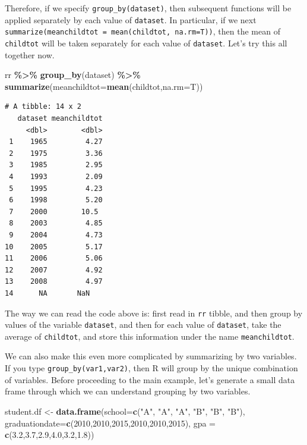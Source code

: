 \documentclass[
]{book}
\newenvironment{Shaded}{\begin{snugshade}}{\end{snugshade}}
\newcommand{\AttributeTok}[1]{\textcolor[rgb]{0.13,0.29,0.53}{#1}}
\newcommand{\DecValTok}[1]{\textcolor[rgb]{0.00,0.00,0.81}{#1}}
\newcommand{\FloatTok}[1]{\textcolor[rgb]{0.00,0.00,0.81}{#1}}
\newcommand{\FunctionTok}[1]{\textcolor[rgb]{0.13,0.29,0.53}{\textbf{#1}}}
\newcommand{\NormalTok}[1]{#1}
\newcommand{\OtherTok}[1]{\textcolor[rgb]{0.56,0.35,0.01}{#1}}
\newcommand{\SpecialCharTok}[1]{\textcolor[rgb]{0.81,0.36,0.00}{\textbf{#1}}}
\newcommand{\StringTok}[1]{\textcolor[rgb]{0.31,0.60,0.02}{#1}}
\begin{document}
Therefore, if we specify \texttt{group\_by(dataset)}, then subsequent functions will be applied separately by each value of \texttt{dataset}. In particular, if we next \texttt{summarize(meanchildtot\ =\ mean(childtot,\ na.rm=T))}, then the mean of \texttt{childtot} will be taken separately for each value of \texttt{dataset}. Let's try this all together now.

\begin{Shaded}
\begin{Highlighting}[]
\NormalTok{rr }\SpecialCharTok{\%\textgreater{}\%}
  \FunctionTok{group\_by}\NormalTok{(dataset) }\SpecialCharTok{\%\textgreater{}\%}
  \FunctionTok{summarize}\NormalTok{(}\AttributeTok{meanchildtot=}\FunctionTok{mean}\NormalTok{(childtot,}\AttributeTok{na.rm=}\NormalTok{T))}
\end{Highlighting}
\end{Shaded}

\begin{verbatim}
# A tibble: 14 x 2
   dataset meanchildtot
     <dbl>        <dbl>
 1    1965         4.27
 2    1975         3.36
 3    1985         2.95
 4    1993         2.09
 5    1995         4.23
 6    1998         5.20
 7    2000        10.5 
 8    2003         4.85
 9    2004         4.73
10    2005         5.17
11    2006         5.06
12    2007         4.92
13    2008         4.97
14      NA       NaN   
\end{verbatim}

The way we can read the code above is: first read in \texttt{rr} tibble, and then group by values of the variable \texttt{dataset}, and then for each value of \texttt{dataset}, take the average of \texttt{childtot}, and store this information under the name \texttt{meanchildtot}.

We can also make this even more complicated by summarizing by two variables. If you type \texttt{group\_by(var1,var2)}, then R will group by the unique combination of variables. Before proceeding to the main example, let's generate a small data frame through which we can understand grouping by two variables.

\begin{Shaded}
\begin{Highlighting}[]
\NormalTok{student.df }\OtherTok{\textless{}{-}} \FunctionTok{data.frame}\NormalTok{(}\AttributeTok{school=}\FunctionTok{c}\NormalTok{(}\StringTok{"A"}\NormalTok{, }\StringTok{"A"}\NormalTok{, }\StringTok{"A"}\NormalTok{, }\StringTok{"B"}\NormalTok{, }\StringTok{"B"}\NormalTok{, }\StringTok{"B"}\NormalTok{),}
                        \AttributeTok{graduationdate=}\FunctionTok{c}\NormalTok{(}\DecValTok{2010}\NormalTok{,}\DecValTok{2010}\NormalTok{,}\DecValTok{2015}\NormalTok{,}\DecValTok{2010}\NormalTok{,}\DecValTok{2010}\NormalTok{,}\DecValTok{2015}\NormalTok{),}
                        \AttributeTok{gpa =} \FunctionTok{c}\NormalTok{(}\FloatTok{3.2}\NormalTok{,}\FloatTok{3.7}\NormalTok{,}\FloatTok{2.9}\NormalTok{,}\FloatTok{4.0}\NormalTok{,}\FloatTok{3.2}\NormalTok{,}\FloatTok{1.8}\NormalTok{))}
\end{Highlighting}
\end{Shaded}
\end{document}
